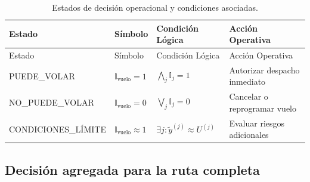 \documentclass[
  spanish,
  us-letterpaper,
]{scrreprt}
\numberwithin{equation}{section}
\begin{document}
\begin{longtable}[]{@{}
  >{\raggedright\arraybackslash}p{}
  >{\raggedright\arraybackslash}p{}
  >{\raggedright\arraybackslash}p{}
  >{\raggedright\arraybackslash}p{}@{}}
\caption{Estados de decisión operacional y condiciones
asociadas.}\label{tbl-estados-decision}\tabularnewline
\toprule\noalign{}
\begin{minipage}[b]{\linewidth}\raggedright
Estado
\end{minipage} & \begin{minipage}[b]{\linewidth}\raggedright
Símbolo
\end{minipage} & \begin{minipage}[b]{\linewidth}\raggedright
Condición Lógica
\end{minipage} & \begin{minipage}[b]{\linewidth}\raggedright
Acción Operativa
\end{minipage} \\
\midrule\noalign{}
\endfirsthead
\toprule\noalign{}
\begin{minipage}[b]{\linewidth}\raggedright
Estado
\end{minipage} & \begin{minipage}[b]{\linewidth}\raggedright
Símbolo
\end{minipage} & \begin{minipage}[b]{\linewidth}\raggedright
Condición Lógica
\end{minipage} & \begin{minipage}[b]{\linewidth}\raggedright
Acción Operativa
\end{minipage} \\
\midrule\noalign{}
\endhead
\bottomrule\noalign{}
\endlastfoot
PUEDE\_VOLAR & \(\mathbb{I}_{\text{vuelo}} = 1\) &
\(\bigwedge_j \mathbb{I}_j = 1\) & Autorizar despacho inmediato \\
NO\_PUEDE\_VOLAR & \(\mathbb{I}_{\text{vuelo}} = 0\) &
\(\bigvee_j \mathbb{I}_j = 0\) & Cancelar o reprogramar vuelo \\
CONDICIONES\_LÍMITE & \(\mathbb{I}_{\text{vuelo}} \approx 1\) &
\(\exists j : \tilde{y}^{(j)} \approx U^{(j)}\) & Evaluar riesgos
adicionales \\
\end{longtable}

\subsection{Decisión agregada para la ruta
completa}\label{decisiuxf3n-agregada-para-la-ruta-completa}
\end{document}
